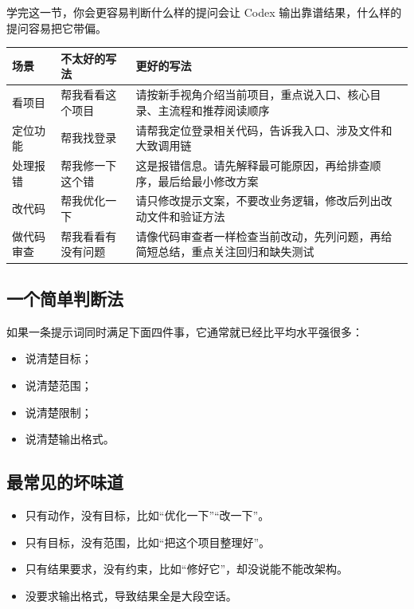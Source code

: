\documentclass[UTF8,a4paper,12pt]{ctexart}
\begin{document}
\begin{learnbox}
学完这一节，你会更容易判断什么样的提问会让 Codex 输出靠谱结果，什么样的提问容易把它带偏。
\end{learnbox}

\begin{longtable}{p{} p{} p{}}
\toprule
场景 & 不太好的写法 & 更好的写法 \\
\midrule
\endhead
看项目 & 帮我看看这个项目 & 请按新手视角介绍当前项目，重点说入口、核心目录、主流程和推荐阅读顺序 \\
定位功能 & 帮我找登录 & 请帮我定位登录相关代码，告诉我入口、涉及文件和大致调用链 \\
处理报错 & 帮我修一下这个错 & 这是报错信息。请先解释最可能原因，再给排查顺序，最后给最小修改方案 \\
改代码 & 帮我优化一下 & 请只修改提示文案，不要改业务逻辑，修改后列出改动文件和验证方法 \\
做代码审查 & 帮我看看有没有问题 & 请像代码审查者一样检查当前改动，先列问题，再给简短总结，重点关注回归和缺失测试 \\
\bottomrule
\end{longtable}

\subsection{一个简单判断法}

如果一条提示词同时满足下面四件事，它通常就已经比平均水平强很多：
\begin{itemize}
  \item 说清楚目标；
  \item 说清楚范围；
  \item 说清楚限制；
  \item 说清楚输出格式。
\end{itemize}

\subsection{最常见的坏味道}

\begin{itemize}
  \item 只有动作，没有目标，比如“优化一下”“改一下”。
  \item 只有目标，没有范围，比如“把这个项目整理好”。
  \item 只有结果要求，没有约束，比如“修好它”，却没说能不能改架构。
  \item 没要求输出格式，导致结果全是大段空话。
\end{itemize}
\end{document}
